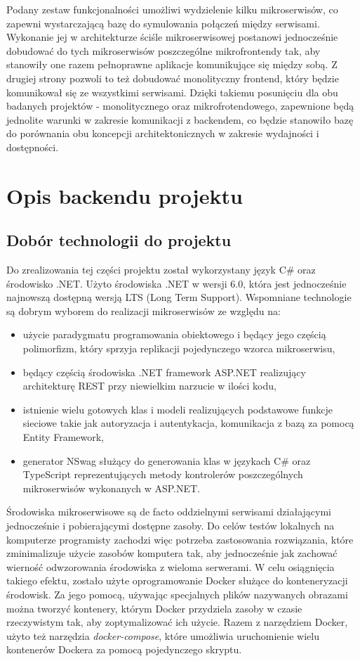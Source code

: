 \documentclass{SGGW-thesis}
\begin{document}
Podany zestaw funkcjonalności umożliwi wydzielenie kilku mikroserwisów, co zapewni wystarczającą bazę do symulowania połączeń między serwisami. Wykonanie jej w architekturze ściśle mikroserwisowej postanowi jednocześnie dobudować do tych mikroserwisów poszczególne mikrofrontendy tak, aby stanowiły one razem pełnoprawne aplikacje komunikujące się między sobą. Z drugiej strony pozwoli to też dobudować monolityczny frontend, który będzie komunikował się ze wszystkimi serwisami. Dzięki takiemu posunięciu dla obu badanych projektów - monolitycznego oraz mikrofrotendowego, zapewnione będą jednolite warunki w zakresie komunikacji z backendem, co będzie stanowiło bazę do porównania obu koncepcji architektonicznych w zakresie wydajności i dostępności.

\chapter{Opis backendu projektu}
  \section{Dobór technologii do projektu}
  Do zrealizowania tej części projektu został wykorzystany język C\# oraz środowisko .NET. Użyto środowiska .NET w wersji 6.0, która jest jednocześnie najnowszą dostępną wersją LTS (Long Term Support). Wspomniane technologie są dobrym wyborem do realizacji mikroserwisów ze względu na:
  
  \begin{itemize}
    \item użycie paradygmatu programowania obiektowego i będący jego częścią polimorfizm, który sprzyja replikacji pojedynczego wzorca mikroserwisu,
    \item będący częścią środowiska .NET framework ASP.NET realizujący architekturę REST przy niewielkim narzucie w ilości kodu,
    \item istnienie wielu gotowych klas i modeli realizujących podstawowe funkcje sieciowe takie jak autoryzacja i autentykacja, komunikacja z bazą za pomocą Entity Framework,
    \item generator NSwag służący do generowania klas w językach C\# oraz TypeScript reprezentujących metody kontrolerów poszczególnych mikroserwisów wykonanych w ASP.NET.
  \end{itemize}

  Środowiska mikroserwisowe są de facto oddzielnymi serwisami działającymi jednocześnie i pobierającymi dostępne zasoby. Do celów testów lokalnych na komputerze programisty zachodzi więc potrzeba zastosowania rozwiązania, które zminimalizuje użycie zasobów komputera tak, aby jednocześnie jak zachować wierność odwzorowania środowiska z wieloma serwerami. W celu osiągnięcia takiego efektu, zostało użyte oprogramowanie Docker służące do konteneryzacji środowisk. Za jego pomocą, używając specjalnych plików nazywanych obrazami można tworzyć kontenery, którym Docker przydziela zasoby w czasie rzeczywistym tak, aby zoptymalizować ich użycie. 
  Razem z narzędziem Docker, użyto też narzędzia \textit{docker-compose}, które umożliwia uruchomienie wielu kontenerów Dockera za pomocą pojedynczego skryptu.
\end{document}
